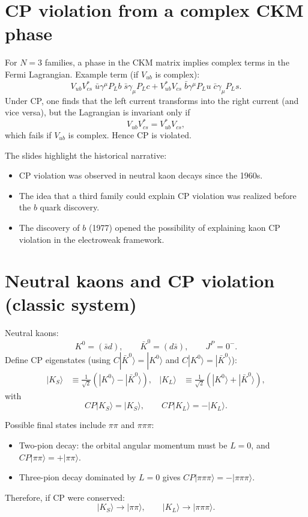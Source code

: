 \section{CP violation from a complex CKM phase}
For $N=3$ families, a phase in the CKM matrix implies complex terms in the Fermi Lagrangian.
Example term (if $V_{ub}$ is complex):
\begin{equation}
V_{ub}V^\ast_{cs}\;\bar u\gamma^\mu P_L b\;\bar s\gamma_\mu P_L c
+
V^\ast_{ub}V_{cs}\;\bar b\gamma^\mu P_L u\;\bar c\gamma_\mu P_L s.
\end{equation}
Under CP, one finds that the left current transforms into the right current (and vice versa),
but the Lagrangian is invariant only if
\begin{equation}
V_{ub}V^\ast_{cs}=V^\ast_{ub}V_{cs},
\end{equation}
which fails if $V_{ub}$ is complex. Hence CP is violated.

The slides highlight the historical narrative:
\begin{itemize}
  \item CP violation was observed in neutral kaon decays since the 1960s.
  \item The idea that a third family could explain CP violation was realized before the $b$ quark discovery.
  \item The discovery of $b$ (1977) opened the possibility of explaining kaon CP violation in the electroweak framework.
\end{itemize}

\section{Neutral kaons and CP violation (classic system)}
Neutral kaons:
\begin{equation}
K^0=(\bar s d),\qquad \bar K^0=(d\bar s),
\qquad J^P=0^-.
\end{equation}
Define CP eigenstates (using $C|\bar K^0\rangle=|K^0\rangle$ and $C|K^0\rangle=|\bar K^0\rangle$):
\begin{align}
|K_S\rangle &\equiv \frac{1}{\sqrt2}\left(|K^0\rangle-|\bar K^0\rangle\right),
&
|K_L\rangle &\equiv \frac{1}{\sqrt2}\left(|K^0\rangle+|\bar K^0\rangle\right),
\end{align}
with
\begin{equation}
CP|K_S\rangle=|K_S\rangle,\qquad CP|K_L\rangle=-|K_L\rangle.
\end{equation}

Possible final states include $\pi\pi$ and $\pi\pi\pi$:
\begin{itemize}
  \item Two-pion decay: the orbital angular momentum must be $L=0$, and $CP|\pi\pi\rangle=+|\pi\pi\rangle$.
  \item Three-pion decay dominated by $L=0$ gives $CP|\pi\pi\pi\rangle=-|\pi\pi\pi\rangle$.
\end{itemize}
Therefore, if CP were conserved:
\begin{equation}
|K_S\rangle \to |\pi\pi\rangle,
\qquad
|K_L\rangle \to |\pi\pi\pi\rangle.
\end{equation}

